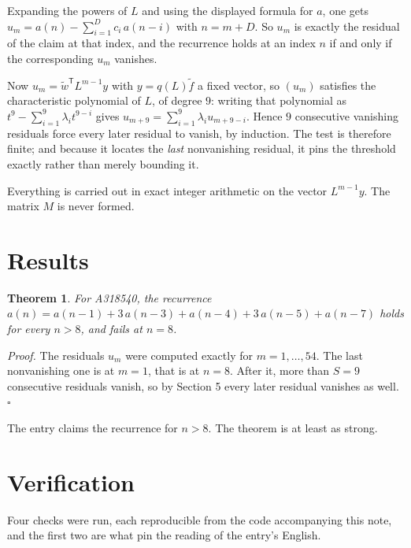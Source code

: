 \documentclass[11pt]{article}
\newtheorem{theorem}{Theorem}
\theoremstyle{definition}
\begin{document}
Expanding the powers of $L$ and using the displayed formula for $a$, one gets $u_m = a(n) - \sum_{i=1}^{D} c_i\,a(n-i)$ with $n = m + D$. So $u_m$ is exactly the residual of the claim at that index, and the recurrence holds at an index $n$ if and only if the corresponding $u_m$ vanishes.

Now $u_m = \tilde w^{\mathsf T} L^{m-1} y$ with $y = q(L)\tilde f$ a fixed vector, so $(u_m)$ satisfies the characteristic polynomial of $L$, of degree $9$: writing that polynomial as $t^{9} - \sum_{i=1}^{9} \lambda_i t^{9-i}$ gives $u_{m+9} = \sum_{i=1}^{9} \lambda_i u_{m+9-i}$. Hence $9$ consecutive vanishing residuals force every later residual to vanish, by induction. The test is therefore finite; and because it locates the {\itshape last} nonvanishing residual, it pins the threshold exactly rather than merely bounding it.

Everything is carried out in exact integer arithmetic on the vector $L^{m-1}y$. The matrix $M$ is never formed.

\section{Results}

\begin{theorem} For A318540, the recurrence $a(n) = a(n-1) + 3\,a(n-3) + a(n-4) + 3\,a(n-5) + a(n-7)$ holds for every $n > 8$, and fails at $n = 8$.\end{theorem}

{\itshape Proof.} The residuals $u_m$ were computed exactly for $m = 1,\dots,54$. The last nonvanishing one is at $m = 1$, that is at $n = 8$. After it, more than $S = 9$ consecutive residuals vanish, so by Section 5 every later residual vanishes as well. $\square$

The entry claims the recurrence for $n > 8$. The theorem is at least as strong.

\section{Verification}

Four checks were run, each reproducible from the code accompanying this note, and the first two are what pin the reading of the entry's English.
\end{document}
